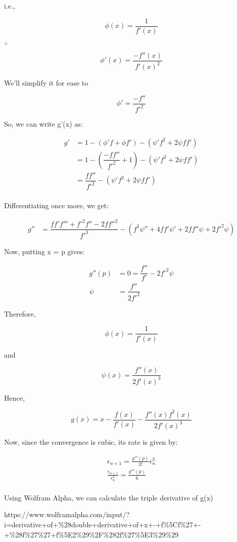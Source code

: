 \documentclass[11pt]{article}
\begin{document}
    i.e.,

    \[\phi(x) = \frac{1}{f'(x)}\]

    \(\therefore\)

    \[\phi'(x) = \frac{-f''(x)}{f'(x)^2}\]

    We'll simplify it for ease to

    \[\phi' = \frac{-f''}{f'^2}\]

    So, we can write g'(x) as:

    \begin{align*}
g' &= 1 - (\phi'f + \phi f') - (\psi'f^2 + 2\psi ff') \\
&= 1 - (\dfrac{-ff''}{f'^2} + 1) - (\psi'f^2 + 2\psi ff') \\
&= \dfrac{ff''}{f'^2} - (\psi'f^2 + 2\psi ff') \\
\end{align*}

    Differentiating once more, we get:

    \begin{align*}
g'' &= \dfrac{ff'f''' + f'^2f'' - 2ff''^2}{f'^3} - (f^2\psi'' + 4ff'\psi' + 2ff''\psi + 2f'^2\psi)
\end{align*}

    Now, putting x = p gives:

    \begin{align*}
g''(p) &= 0 = \dfrac{f''}{f'} - 2f'^2\psi \\
\psi &= \dfrac{f''}{2f'^3}
\end{align*}

    Therefore,

    \[\phi(x) = \frac{1}{f'(x)}\]

    and

    \[\psi(x) = \dfrac{f''(x)}{2f'(x)^3}\]

    Hence,

    \[g(x) = x - \dfrac{f(x)}{f'(x)} - \dfrac{f''(x)f^2(x)}{2f'(x)^3}\]

    Now, since the convergence is cubic, its rate is given by:

\begin{align*}
\epsilon_{n+1} = \frac{g'''(p)}{3!} \epsilon_n^3 \\
\frac{\epsilon_{n+1}}{\epsilon_n^3} = \frac{g'''(p)}{6} \\
\end{align*}

    Using Wolfram Alpha, we can calculate the triple derivative of g(x)

https://www.wolframalpha.com/input/?i=derivative+of+\%28double+derivative+of+x+-+f\%5Cf\%27+-+\%28f\%27\%27+f\%5E2\%29\%2F\%282f\%27\%5E3\%29\%29
\end{document}
